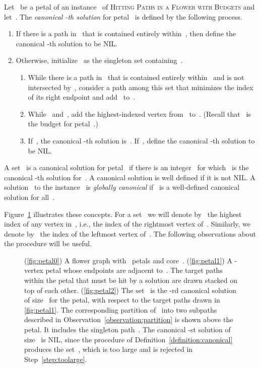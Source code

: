 \let\accentvec\vec  \documentclass{llncs}
\newcommand{\HitPathsInFlower}{\textsc{Hitting Paths in a Flower with Budgets}\xspace}
\begin{document}
\begin{definition} \label{definition:canonical}
Let~ be a petal of an instance~ of \HitPathsInFlower and let~. The \emph{canonical -th solution} for petal~ is defined by the following process.
\begin{enumerate}
	\item If there is a path in~ that is contained entirely within~, then define the canonical -th solution to be NIL.\label{step:earlyout}
	\item Otherwise, initialize~ as the singleton set containing~.
	\begin{enumerate}
		\item While there is a path in~ that is contained entirely within~ and is not intersected by~, consider a path among this set that minimizes the index~ of its right endpoint and add~ to~.\label{step:hitpath}
		\item While~ and~, add the highest-indexed vertex from~ to~. (Recall that~ is the budget for petal~.)\label{step:fillsize}
		\item If~, the canonical -th solution is~. If~, define the canonical -th solution to be NIL.\label{step:toolarge}
		\end{enumerate}
\end{enumerate}
A set~ is a canonical solution for petal~ if there is an integer~ for which~ is the canonical -th solution for~. A canonical solution is well defined if it is not NIL. A solution~ to the instance~ is \emph{globally canonical} if~ is a well-defined canonical solution for all~.
\end{definition}

Figure~\ref{fig:petals} illustrates these concepts. For a set~ we will denote by~ the highest index of any vertex in~, i.e., the index of the rightmost vertex of~. Similarly, we denote by~ the index of the leftmost vertex of~. The following observations about the procedure will be useful.

\begin{figure}[t]
\begin{center}
\caption{(\ref{fig:petal0}) A flower graph with~ petals and core~. (\ref{fig:petal1}) A -vertex petal whose endpoints are adjacent to~. The target paths within the petal that must be hit by a solution are drawn stacked on top of each other. (\ref{fig:petal2}) The set~ is the -rd canonical solution of size~ for the petal, with respect to the target paths drawn in \ref{fig:petal1}. The corresponding partition of~ into two subpaths described in Observation~\ref{observation:partition} is shown above the petal. It includes the singleton path~. The canonical -st solution of size~ is NIL, since the procedure of Definition~\ref{definition:canonical} produces the set~, which is too large and is rejected in Step~\ref{step:toolarge}.}
\end{center}\label{fig:petals}
\end{figure}
\end{document}
